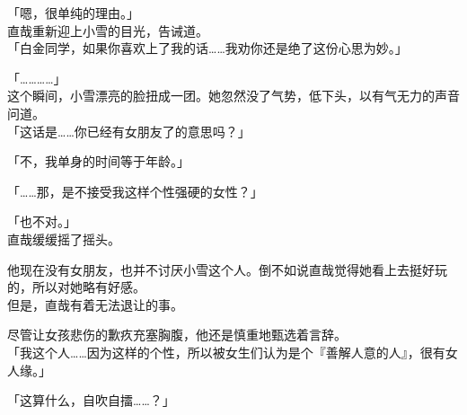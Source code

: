 「嗯，很单纯的理由。」\\

直哉重新迎上小雪的目光，告诫道。\\

「白金同学，如果你喜欢上了我的话……我劝你还是绝了这份心思为妙。」

「…………」\\

这个瞬间，小雪漂亮的脸扭成一团。她忽然没了气势，低下头，以有气无力的声音问道。\\

「这话是……你已经有女朋友了的意思吗？」

「不，我单身的时间等于年龄。」

「……那，是不接受我这样个性强硬的女性？」

「也不对。」\\

直哉缓缓摇了摇头。

他现在没有女朋友，也并不讨厌小雪这个人。倒不如说直哉觉得她看上去挺好玩的，所以对她略有好感。\\

但是，直哉有着无法退让的事。

尽管让女孩悲伤的歉疚充塞胸腹，他还是慎重地甄选着言辞。\\

「我这个人……因为这样的个性，所以被女生们认为是个『善解人意的人』，很有女人缘。」

「这算什么，自吹自擂……？」

